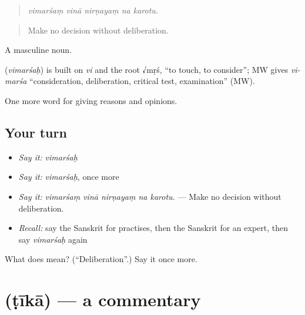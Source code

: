 \begin{quote}
    
\end{quote}

\begin{quote}
\emph{vimarśaṃ vinā nirṇayaṃ na karotu.}
\end{quote}

\begin{quote}
Make no decision without deliberation.
\end{quote}

A masculine noun.

\begin{cousinweb}
\textbf{} (\emph{vimarśaḥ}) is built on \emph{vi} and the root √mṛś, \textquotedblleft{}to touch, to consider\textquotedblright{}; MW gives \emph{vi-marśa} \textquotedblleft{}consideration, deliberation, critical test, examination\textquotedblright{} (MW).
\end{cousinweb}

\begin{grammarlens}[title={What you've built}]
One more word for giving reasons and opinions.
\end{grammarlens}

\subsection*{Your turn}
\begin{itemize}
\raggedright
  \item \emph{Say it:} \emph{vimarśaḥ}
  \item \emph{Say it:} \emph{vimarśaḥ}, once more
  \item \emph{Say it:} \emph{vimarśaṃ vinā nirṇayaṃ na karotu.} — Make no decision without deliberation.
  \item \emph{Recall:} say the Sanskrit for practises, then the Sanskrit for an expert, then say \emph{vimarśaḥ} again
\end{itemize}

\begin{tcolorbox}[breakable,colback=teal!4,colframe=teal!35!black,title={Before you move on}]
What does  mean? (\textquotedblleft{}Deliberation\textquotedblright{}.) Say it once more.
\end{tcolorbox}
\section[\texorpdfstring{\sk{टीका} (ṭīkā)}{टीका (ṭīkā)}]{ (ṭīkā) — a commentary}

